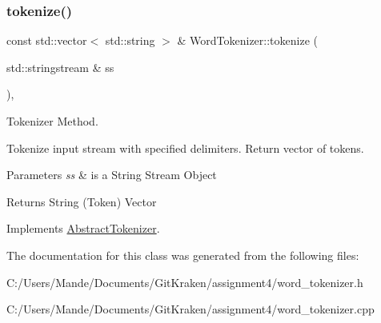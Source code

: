 \subsubsection{\texorpdfstring{tokenize()}{tokenize()}}
{\footnotesize\ttfamily const std\+::vector$<$ std\+::string $>$ \& Word\+Tokenizer\+::tokenize (\begin{DoxyParamCaption}\item[{std\+::stringstream \&}]{ss }\end{DoxyParamCaption})\hspace{0.3cm}{\ttfamily [override]}, {\ttfamily [virtual]}}



Tokenizer Method. 

Tokenize input stream with specified delimiters. Return vector of tokens.


\begin{DoxyParams}{Parameters}
{\em ss} & is a String Stream Object \\
\hline
\end{DoxyParams}
\begin{DoxyReturn}{Returns}
String (Token) Vector 
\end{DoxyReturn}


Implements \hyperlink{class_abstract_tokenizer_a566f425fc415ed1dfefc13706868a3ff}{Abstract\+Tokenizer}.



The documentation for this class was generated from the following files\+:\begin{DoxyCompactItemize}
\item 
C\+:/\+Users/\+Mande/\+Documents/\+Git\+Kraken/assignment4/word\+\_\+tokenizer.\+h\item 
C\+:/\+Users/\+Mande/\+Documents/\+Git\+Kraken/assignment4/word\+\_\+tokenizer.\+cpp\end{DoxyCompactItemize}
